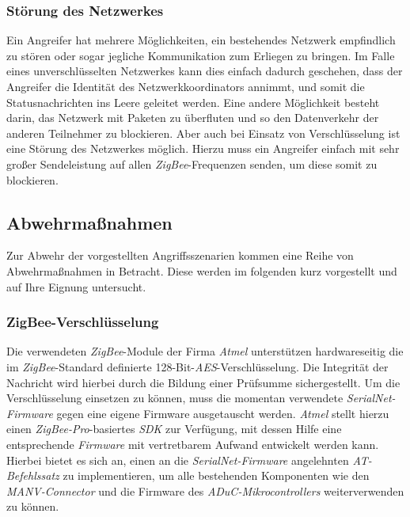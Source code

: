 \subsubsection{Störung des Netzwerkes}
Ein Angreifer hat mehrere Möglichkeiten, ein bestehendes Netzwerk empfindlich zu stören oder sogar jegliche Kommunikation
zum Erliegen zu bringen. Im Falle eines unverschlüsselten Netzwerkes kann dies einfach dadurch geschehen, dass 
der Angreifer die Identität des Netzwerkkoordinators annimmt, und somit die Statusnachrichten ins Leere geleitet werden. Eine
andere Möglichkeit besteht darin, das Netzwerk mit Paketen zu überfluten und so den Datenverkehr der anderen Teilnehmer
zu blockieren. Aber auch bei Einsatz von Verschlüsselung ist eine Störung des Netzwerkes möglich. Hierzu muss ein Angreifer
einfach mit sehr großer Sendeleistung auf allen \emph{ZigBee}-Frequenzen senden, um diese somit zu blockieren. 

\subsection{Abwehrmaßnahmen}

Zur Abwehr der vorgestellten Angriffsszenarien kommen eine Reihe von Abwehrmaßnahmen in Betracht. Diese werden im
folgenden kurz vorgestellt und auf Ihre Eignung untersucht.

\subsubsection{ZigBee-Verschlüsselung}
Die verwendeten \emph{ZigBee}-Module der Firma \emph{Atmel} unterstützen hardwareseitig die im 
\emph{ZigBee}-Standard definierte 128-Bit-\emph{AES}-Verschlüsselung. Die Integrität der Nachricht wird hierbei durch
die Bildung einer Prüfsumme sichergestellt. Um die Verschlüsselung einsetzen zu können, muss die momentan 
verwendete \emph{SerialNet-Firmware} gegen eine eigene Firmware ausgetauscht werden. \emph{Atmel} 
stellt hierzu einen \emph{ZigBee-Pro}-basiertes 
\emph{SDK} zur Verfügung, mit dessen Hilfe eine entsprechende \emph{Firmware} mit vertretbarem Aufwand entwickelt 
werden kann. Hierbei bietet es sich an, einen an die \emph{SerialNet-Firmware} angelehnten \emph{AT-Befehlssatz} zu 
implementieren, um alle bestehenden Komponenten wie den \emph{MANV-Connector} und die Firmware des 
\emph{ADuC-Mikrocontrollers} weiterverwenden zu können.

